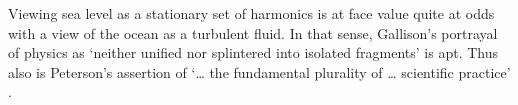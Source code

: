 Viewing sea level as a stationary set of harmonics is at face value quite at odds with a view of the ocean as a turbulent fluid.   In that sense, Gallison's portrayal of physics as `neither unified nor splintered into isolated fragments' \citep[pp 782]{Galison:1987wh} is apt.  Thus also is Peterson's assertion of `\dots{} the fundamental plurality of \dots{} scientific practice' \cite{Petersen:2012tr}. 
